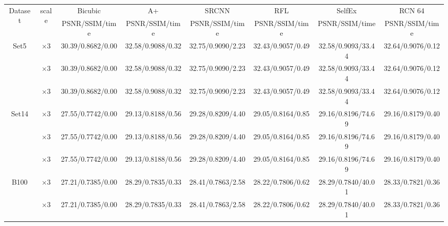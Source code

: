 \documentclass[10pt,twocolumn,letterpaper]{article}
\begin{document}

\begin{table}
\begin{center}
\setlength{\tabcolsep}{2pt}
\footnotesize
\begin{tabular}{ | c | c | c | c | c | c | c | c | }
\hline
\multirow{2}{*}{Dataset} & \multirow{2}{*}{scale} & Bicubic & A+ & SRCNN & RFL & SelfEx & RCN 64\\
 & & PSNR/SSIM/time & PSNR/SSIM/time & PSNR/SSIM/time & PSNR/SSIM/time & PSNR/SSIM/time & PSNR/SSIM/time\\
\hline
\hline
\multirow{3}{*}{Set5} & $\times$3 & 30.39/0.8682/0.00 & 32.58/0.9088/0.32 & {\color{red}32.75}/{\color{blue}0.9090}/2.23 & 32.43/0.9057/0.49 & 32.58/{\color{red}0.9093}/33.44 & {\color{blue}32.64}/0.9076/0.12\\
 & $\times$3 & 30.39/0.8682/0.00 & 32.58/0.9088/0.32 & {\color{red}32.75}/{\color{blue}0.9090}/2.23 & 32.43/0.9057/0.49 & 32.58/{\color{red}0.9093}/33.44 & {\color{blue}32.64}/0.9076/0.12\\
 & $\times$3 & 30.39/0.8682/0.00 & 32.58/0.9088/0.32 & {\color{red}32.75}/{\color{blue}0.9090}/2.23 & 32.43/0.9057/0.49 & 32.58/{\color{red}0.9093}/33.44 & {\color{blue}32.64}/0.9076/0.12\\
\hline
\hline
\multirow{3}{*}{Set14} & $\times$3 & 27.55/0.7742/0.00 & 29.13/0.8188/0.56 & {\color{red}29.28}/{\color{red}0.8209}/4.40 & 29.05/0.8164/0.85 & 29.16/{\color{blue}0.8196}/74.69 & {\color{blue}29.16}/0.8179/0.40\\
 & $\times$3 & 27.55/0.7742/0.00 & 29.13/0.8188/0.56 & {\color{red}29.28}/{\color{red}0.8209}/4.40 & 29.05/0.8164/0.85 & 29.16/{\color{blue}0.8196}/74.69 & {\color{blue}29.16}/0.8179/0.40\\
 & $\times$3 & 27.55/0.7742/0.00 & 29.13/0.8188/0.56 & {\color{red}29.28}/{\color{red}0.8209}/4.40 & 29.05/0.8164/0.85 & 29.16/{\color{blue}0.8196}/74.69 & {\color{blue}29.16}/0.8179/0.40\\
\hline
\hline
\multirow{3}{*}{B100} & $\times$3 & 27.21/0.7385/0.00 & 28.29/0.7835/0.33 & {\color{red}28.41}/{\color{red}0.7863}/2.58 & 28.22/0.7806/0.62 & 28.29/{\color{blue}0.7840}/40.01 & {\color{blue}28.33}/0.7821/0.36\\
 & $\times$3 & 27.21/0.7385/0.00 & 28.29/0.7835/0.33 & {\color{red}28.41}/{\color{red}0.7863}/2.58 & 28.22/0.7806/0.62 & 28.29/{\color{blue}0.7840}/40.01 & {\color{blue}28.33}/0.7821/0.36\\

\end{tabular}
\end{center}
\end{table}
\end{document}

